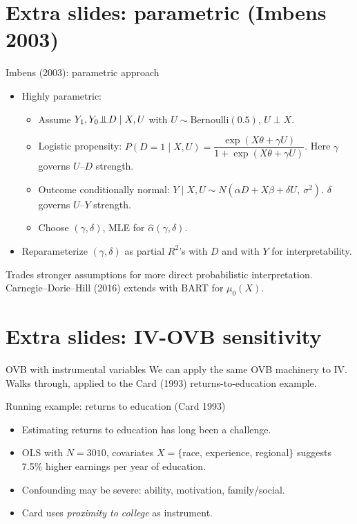 \documentclass[xcolor=dvipsnames]{beamer}
\newcommand{\indep}{{\bot\negthickspace\negthickspace\bot}}
\begin{document}
\section{Extra slides: parametric (Imbens 2003)}

\begin{frame}{Imbens (2003): parametric approach}
\footnotesize
\begin{itemize}
\item Highly parametric:
\begin{itemize}\smallskip
\item Assume $Y_1, Y_0 \indep D \mid X, U$ with $U \sim \mathrm{Bernoulli}(0.5)$, $U \perp X$.\smallskip
\item Logistic propensity: $P(D=1 \mid X, U) = \dfrac{\exp(X\theta + \gamma U)}{1 + \exp(X\theta + \gamma U)}$. Here $\gamma$ governs $U$--$D$ strength.\smallskip
\item Outcome conditionally normal: $Y \mid X, U \sim N(\alpha D + X\beta + \delta U,\ \sigma^2)$. $\delta$ governs $U$--$Y$ strength.\smallskip
\item Choose $(\gamma, \delta)$, MLE for $\hat{\alpha}(\gamma, \delta)$.
\end{itemize}
\item Reparameterize $(\gamma, \delta)$ as partial $R^2$'s with $D$ and with $Y$ for interpretability.
\end{itemize}
\bigskip
Trades stronger assumptions for more direct probabilistic interpretation. Carnegie--Dorie--Hill (2016) extends with BART for $\mu_0(X)$.
\end{frame}


\section{Extra slides: IV-OVB sensitivity}

\begin{frame}{OVB with instrumental variables}
\small
We can apply the same OVB machinery to IV. Walks through, applied to the Card (1993) returns-to-education example.
\end{frame}


\begin{frame}{Running example: returns to education (Card 1993)}
\small
\begin{itemize}
\item<1-> Estimating returns to education has long been a challenge.
\item<2-> OLS with $N=3010$, covariates $X = \{$race, experience, regional$\}$ suggests 7.5\% higher earnings per year of education.
\item<3-> Confounding may be severe: ability, motivation, family/social.
\item<4-> Card uses \textit{proximity to college} as instrument.
\end{itemize}
\end{frame}
\end{document}

